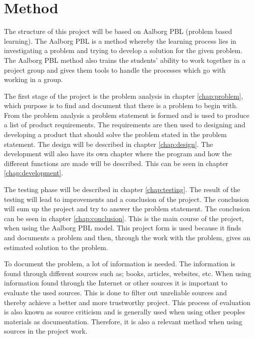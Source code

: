\section{Method}
The structure of this project will be based on Aalborg PBL (problem based learning). The Aalborg PBL is a method whereby the learning process lies in investigating a problem and trying to develop a solution for the given problem.
The Aalborg PBL method also trains the students' ability to work together in a project group and gives them tools to handle the processes which go with working in a group.

The first stage of the project is the problem analysis in chapter \ref{chap:problem}, which purpose is to find and document that there is a problem to begin with. From the problem analysis a problem statement is formed and is used to produce a list of product requirements.
The requirements are then used to designing and developing a product that should solve the problem stated in the problem statement. The design will be described in chapter \ref{chap:design}.
The development will also have its own chapter where the program and how the different functions are made will be described. This can be seen in chapter \ref{chap:development}.

The testing phase will be described in chapter \ref{chap:testing}. The result of the testing will lead to improvements and a conclusion of the project. The conclusion will sum up the project and try to answer the problem statement. The conclusion can be seen in chapter \ref{chap:conclusion}. This is the main course of the project, when using the Aalborg PBL model.
This project form is used because it finds and documents a problem and then, through the work with the problem, gives an estimated solution to the problem.

To document the problem, a lot of information is needed. The information is found through different sources such as; books, articles, websites, etc. When using information found through the Internet or other sources it is important to evaluate the used sources.
This is done to filter out unreliable sources and thereby achieve a better and more trustworthy project.
This process of evaluation is also known as source criticism and is generally used when using other peoples materials as documentation. Therefore, it is also a relevant method when using sources in the project work.